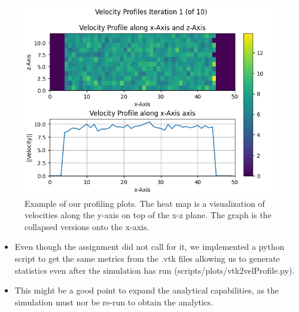 \documentclass{article}
\begin{document}
    \begin{figure}[H]
        \centering
        \includegraphics[width=1\textwidth]{../../res/Profile_example.png}
        \caption{Example of our profiling plots. The heat map is a visualization of velocities along the y-axis on top of the x-z plane. The graph is the collapsed versions onto the x-axis. }
        \label{fig:plot_xmpl}
    \end{figure}

    \begin{itemize}
        \item Even though the assignment did not call for it, we implemented a python script to get the same metrics from the .vtk files allowing us to generate statistics even after the simulation has run (scripts/plots/vtk2velProfile.py).
        \item This might be a good point to expand the analytical capabilities, as the simulation must nor be re-run to obtain the analytics.
    \end{itemize}
\end{document}
